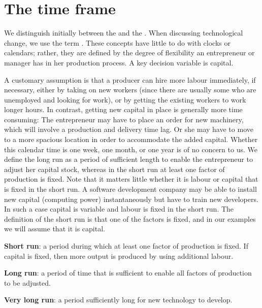 \section{The time frame}\label{sec:ch8sec2}

We distinguish initially between the  and the 
. When discussing technological change, we use the
term . These concepts have little to do with
clocks or calendars; rather, they are defined by the degree of flexibility
an entrepreneur or manager has in her production process. A key decision
variable is capital.

A customary assumption is that a producer can hire more labour immediately,
if necessary, either by taking on new workers (since there are usually some
who are unemployed and looking for work), or by getting the existing workers
to work longer hours. In contrast, getting new capital in place is generally
more time consuming: The entrepreneur may have to place an order for new
machinery, which will involve a production and delivery time lag. Or she may
have to move to a more spacious location in order to accommodate the added
capital. Whether this calendar time is one week, one month, or one year is
of no concern to us. We define the long run as a period of sufficient length
to enable the entrepreneur to adjust her capital stock, whereas in the short
run at least one factor of production is fixed. Note that it matters little
whether it is labour or capital that is fixed in the short run. A software
development company may be able to install new capital (computing power)
instantaneously but have to train new developers. In such a case capital is
variable and labour is fixed in the short run. The definition of the short
run is that one of the factors is fixed, and in our examples we will assume
that it is capital.

\begin{DefBox}
	\textbf{Short run}: a period during which at least one factor of production is fixed. If capital is fixed, then more output is produced by using additional labour.
	
	\textbf{Long run}: a period of time that is sufficient to enable all factors of production to be adjusted.
	
	\textbf{Very long run}: a period sufficiently long for new technology to develop.
\end{DefBox}